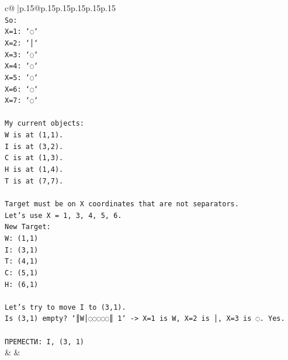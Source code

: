 \documentclass{article}
\begin{document}
{\begin{supertabular}{c@{$\;$}|p{.15\linewidth}@{}p{.15\linewidth}p{.15\linewidth}p{.15\linewidth}p{.15\linewidth}p{.15\linewidth}}
{{{\\ 
\texttt{So:} \\
\texttt{X=1: `◌`} \\
\texttt{X=2: `│`} \\
\texttt{X=3: `◌`} \\
\texttt{X=4: `◌`} \\
\texttt{X=5: `◌`} \\
\texttt{X=6: `◌`} \\
\texttt{X=7: `◌`} \\
\\ 
\texttt{My current objects:} \\
\texttt{W is at (1,1).} \\
\texttt{I is at (3,2).} \\
\texttt{C is at (1,3).} \\
\texttt{H is at (1,4).} \\
\texttt{T is at (7,7).} \\
\\ 
\texttt{Target must be on X coordinates that are not separators.} \\
\texttt{Let's use X = 1, 3, 4, 5, 6.} \\
\texttt{New Target:} \\
\texttt{W: (1,1)} \\
\texttt{I: (3,1)} \\
\texttt{T: (4,1)} \\
\texttt{C: (5,1)} \\
\texttt{H: (6,1)} \\
\\ 
\texttt{Let's try to move I to (3,1).} \\
\texttt{Is (3,1) empty? `║W│◌◌◌◌◌║ 1` {-}> X=1 is W, X=2 is │, X=3 is ◌. Yes.} \\
\\ 
\texttt{ПРЕМЕСТИ: I, (3, 1)} \\
            }
        }
    }
    & & \\ \\


\end{supertabular}}
\end{document}
